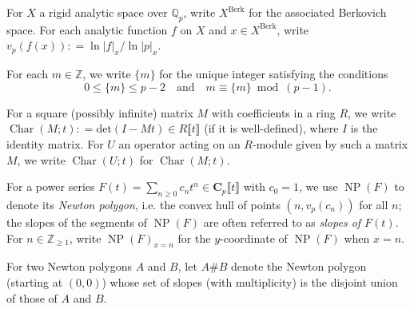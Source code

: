 \documentclass[12pt]{amsart}
\theoremstyle{definition}
\numberwithin{equation}{subsection}
\def\QQ{\mathbb{Q}}
\def\ZZ{\mathbb{Z}}
\def\bfC{\mathbf{C}}
\DeclareMathOperator{\NP}{NP}
\newcommand{\Berk}{\mathrm{Berk}}
\newcommand{\new}{\mathrm{new}}
\newcommand{\Iw}{\mathrm{Iw}}
\renewcommand{\det}{\mathrm{det}}
\DeclareMathOperator{\Char}{Char}
\begin{document}
For $X$ a rigid analytic space over $\QQ_p$, write $X^\Berk$ for the associated Berkovich space.
For each analytic function $f$ on $X$ and $x \in X^\Berk$, write $v_p(f(x)) : = \ln |f|_x / \ln|p|_x$.

\medskip
For each $m \in \ZZ$, we write $\{m\}$ for the unique integer
satisfying the conditions 
$$0\leq \{m\}\leq p-2 \quad \textrm{and} \quad m\equiv \{m\}
\bmod{(p-1)}.$$

For a square (possibly infinite) matrix $M$ with coefficients in a ring $R$, we write $\Char(M; t) : = \det(I- Mt) \in R\llbracket t\rrbracket$ (if it is well-defined), where $I$ is the identity matrix.  For $U$ an operator acting on an $R$-module given by such a matrix $M$, we write $\Char (U;t)$ for $\Char (M;t)$.

For a power series $F(t) = \sum_{n \geq 0} c_nt^n \in \bfC_p\llbracket t\rrbracket$ with $c_0=1$, we use $\NP(F)$ to denote its \emph{Newton polygon}, i.e. the convex hull of points $(n, v_p(c_n))$ for all $n$; the slopes of the segments of $\NP(F)$ are often referred to as \emph{slopes of $F(t)$}. For $n \in \ZZ_{\geq 1}$, write $\NP(F)_{x =n}$ for the $y$-coordinate of $\NP(F)$ when $x=n$.

For two Newton polygons $A$ and $B$, let $A \# B$ denote the Newton polygon (starting at $(0,0)$) whose set of slopes (with multiplicity) is the disjoint union of those of $A$ and $B$.


\end{document}
